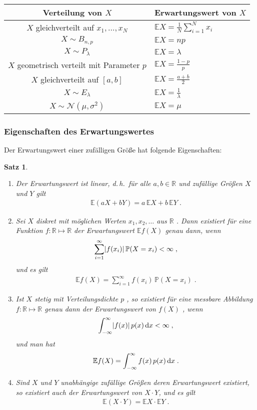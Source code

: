 \documentclass[ngerman,draft,parskip=half,twoside]{scrartcl}
\newtheorem{thm}{Satz}[section]
\DeclarePairedDelimiter{\abs}{\lvert}{\rvert}
\newcommand*{\R}{\mathbb{R}}      %
\newcommand*{\E}{\mathbb{E}}        %
\newcommand*{\WKM}{\mathbb{P}}      %
\newcommand*{\NormVert}{\mathcal{N}} %
\newcommand*{\diff}[1]{%
  \mathop{\mathrm{\mathstrut d}}%
  \ifx#1(\else%
  \ifx#1[\else%
  \ifx#1\{\else%
    \!%
  \fi\fi\fi#1%
}
\begin{document}
{\renewcommand{\arraystretch}{1.4}
\begin{center}
\begin{tabular}{|c|l|}\hline
\bf Verteilung von $X$& \bf Erwartungswert von $X$\\ \hline\hline
$X$ gleichverteilt auf $x_1,\ldots,x_N$& $\E X=\frac{1}{N}\sum_{i=1}^N x_i$\\ \hline
$X\sim B_{n,p}$& $\E X= n p$\\ \hline
$X\sim P_\lambda$&$\E X= \lambda$\\ \hline
$X$ geometrisch verteilt mit Parameter $p$& $\E X = \frac{1-p}{p}$\\ \hline
$X$ gleichverteilt auf $[a,b]$& $\E X= \frac{a+b}{2}$\\ \hline
$X\sim E_\lambda$& $\E X = \frac{1}{\lambda}$\\ \hline
$X\sim \NormVert(\mu,\sigma^2)$&$ \E X = \mu$\\ \hline
\end{tabular}
\end{center}
}
\subsubsection{Eigenschaften des Erwartungswertes}
Der Erwartungswert einer zufälligen Größe hat folgende Eigenschaften:
\begin{thm}~
\begin{enumerate}
\item
Der Erwartungswert ist linear, d.\,h.~für alle $a,b\in\R$ und zufällige Größen $X$ und $Y$
gilt
  \begin{gather*}
    \E(a X+ b Y) = a\,\E X + b\, \E Y\;.
  \end{gather*}
\item
Sei  $X$ diskret mit möglichen Werten $x_1,x_2,\ldots$ aus $\R$ .
Dann existiert für eine Funktion $f \colon\R\mapsto\R$
der Erwartungswert $\E f(X)$ genau dann, wenn
  \begin{gather*}
    \sum_{i=1}^\infty \abs{f(x_i)}\,\WKM(X=x_i)<\infty\;,
  \end{gather*}
und es gilt
  \begin{gather*}
    \E f(X)=\sum_{i=1}^\infty f(x_i)\,\WKM(X=x_i)\;.
  \end{gather*}
\item
Ist $X$ stetig mit Verteilungsdichte $p$ , so existiert für eine messbare
Abbildung $f \colon\R\mapsto\R$ genau dann der Erwartungswert von $f(X)$ , wenn
  \begin{gather*}
    \int_{-\infty}^\infty \abs{f(x)}\,p(x)\diff{x}<\infty\;,
  \end{gather*}
und man hat
  \begin{gather*}
    \E f(X)=\int_{-\infty}^\infty  f(x) \,p(x)\diff{x}\;.
  \end{gather*}
\item
Sind $X$ und $Y$ unabhängige zufällige Größen deren Erwartungswert existiert,
so existiert auch der Erwartungswert von $X\cdot Y$, und es gilt
  \begin{gather*}
    \E(X\cdot Y)= \E X \cdot \E Y\;.
  \end{gather*}
\end{enumerate}
\end{thm}
\end{document}
